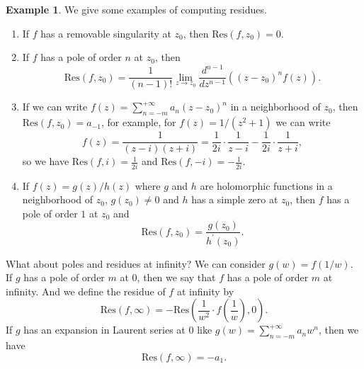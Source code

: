 \documentclass{article}
\theoremstyle{definition}
\newtheorem{example}[theorem]{Example}
\newcommand{\res}{\mathrm{Res}}
\begin{document}
\begin{example}
    We give some examples of computing residues.
    \begin{enumerate}
        \item If \(f\) has a removable singularity at \(z_0\), then \(\res(f,z_0)=0\).
        \item If \(f\) has a pole of order \(n\) at \(z_0\), then \[\res(f,z_0)=\frac{1}{(n-1)!}\lim_{z\to z_0}\frac{d^{n-1}}{dz^{n-1}}((z-z_0)^n f(z)).\]
        \item If we can write \(f(z)=\sum_{n=-m}^{+\infty} a_n (z-z_0)^n\) in a neighborhood of \(z_0\), then \(\res(f,z_0)=a_{-1}\), for example, for $f(z)=1/(z^2+1)$ we can write
        \begin{equation*}
            f(z)=\frac{1}{(z-i)(z+i)}=\frac{1}{2i}\cdot\frac{1}{z-i}-\frac{1}{2i}\cdot\frac{1}{z+i},
        \end{equation*}
        so we have \(\res(f,i)=\frac{1}{2i}\) and \(\res(f,-i)=-\frac{1}{2i}\).
        \item If \(f(z)=g(z)/{h(z)}\) where \(g\) and \(h\) are holomorphic functions in a neighborhood of \(z_0\), \(g(z_0)\neq 0\) and \(h\) has a simple zero at \(z_0\), then \(f\) has a pole of order \(1\) at \(z_0\) and 
        \begin{equation*}
            \res(f,z_0)=\frac{g(z_0)}{h^{\prime}(z_0)}.
        \end{equation*}
    \end{enumerate}
\end{example}
What about poles and residues at infinity? We can consider $g(w)=f(1/w)$. If $g$ has a pole of order $m$ at $0$, then we say that $f$ has a pole of order $m$ at infinity. And we define the residue of $f$ at infinity by 
\[\res(f,\infty) = -\res\left(\frac{1}{w^2}\cdot f\left(\frac{1}{w}\right),0\right).\]
If $g$ has an expansion in Laurent series at $0$ like $g(w)=\sum_{n=-m}^{+\infty} a_n w^n$, then we have 
\[\res(f,\infty) = -a_{1}.\]
\end{document}
